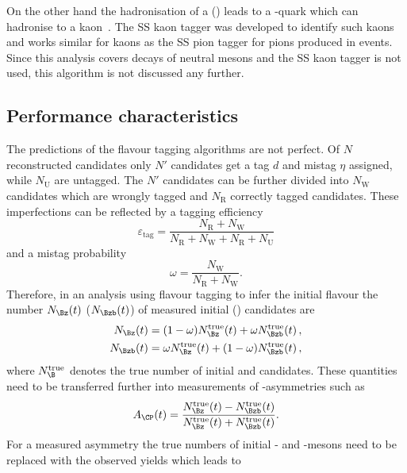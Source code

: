 On the other hand the hadronisation of a \Bs (\bquarkbar\squark) leads to a \squarkbar-quark which can hadronise to a kaon~\cite{Aaij:2016psi}.
The SS kaon tagger was developed to identify such kaons and works similar for kaons as the SS pion tagger for pions produced in \Bz events.
Since this analysis covers decays of neutral \Bz mesons and the SS kaon tagger is not used, this algorithm is not discussed any further.

\subsection{Performance characteristics}

The predictions of the flavour tagging algorithms are not perfect.
Of $N$ reconstructed candidates only $N'$ candidates get a tag $d$ and mistag $\eta$ assigned, while $N_{\text{U}}$ are untagged.
The $N'$ candidates can be further divided into $N_{\text{W}}$ candidates which are wrongly tagged and $N_{\text{R}}$ correctly tagged candidates.
These imperfections can be reflected by a tagging efficiency
\begin{equation}
\varepsilon_{\text{tag}}=\frac{N_{\text{R}}+N_{\text{W}}}{N_{\text{R}}+N_{\text{W}}+N_{\text{R}}+N_{\text{U}}}\label{eq:tageff}
\end{equation}
and a mistag probability
\begin{equation}
\omega=\frac{N_{\text{W}}}{N_{\text{R}}+N_{\text{W}}}.\label{eq:mistag}
\end{equation}
Therefore, in an analysis using flavour tagging to infer the initial \B flavour the number $N_{\Bz}(t)$ ($N_{\Bzb}(t)$) of measured initial \Bz (\Bzb) candidates are
\begin{equation}
\begin{aligned}
N_{\Bz}(t)&=(1-\omega)N_{\Bz}^{\text{true}}(t)+\omega N_{\Bzb}^{\text{true}}(t)\,,\\
N_{\Bzb}(t)&=\omega N_{\Bz}^{\text{true}}(t)+(1-\omega)N_{\Bzb}^{\text{true}}(t)\,,
\end{aligned}
\end{equation}
where $N_{\B}^{\text{true}}$ denotes the true number of initial \Bz and \Bzb candidates.
These quantities need to be transferred further into measurements of \CP-asymmetries such as
\begin{equation}
A_{\CP}(t)=\frac{N_{\Bz}^{\text{true}}(t)-N_{\Bzb}^{\text{true}}(t)}{N_{\Bz}^{\text{true}}(t)+N_{\Bzb}^{\text{true}}(t)}.
\end{equation}
For a measured asymmetry the true numbers of initial \Bz- and \Bzb-mesons need to be replaced with the observed yields which leads to
